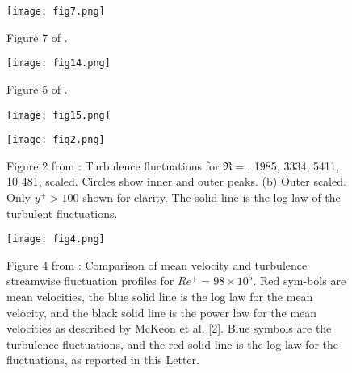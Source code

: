 \documentclass[11pt]{article}
\begin{document}
\begin{figure}[ht]
\begin{center}
\texttt{[image: fig7.png]}\\
\end{center}
\caption{Figure 7 of \cite{bernardini_etal2014}.}
\label{fig:fluctuations}
\end{figure}

\begin{figure}[ht]
\begin{center}
\texttt{[image: fig14.png]}\\
\end{center}
\caption{Figure 5 of \cite{bernardini_etal2014}.}
\label{fig:pe}
\end{figure}

\begin{figure}[ht]
\begin{center}
\texttt{[image: fig15.png]}\\
\end{center}
\caption{}
\label{fig:spec}
\end{figure}

\begin{figure}[ht]
\begin{center}
\texttt{[image: fig2.png]}\\
\end{center}
\caption{Figure 2 from \cite{hultmark_etal201}: Turbulence fluctuations for $\Re =$, 1985, 3334, 5411, 10 481, scaled. Circles show inner and outer peaks. (b) Outer scaled. Only $y^+ > 100$ shown for clarity. The solid line is the log law of the turbulent fluctuations.}
\label{fig:turb_vel}
\end{figure}


\begin{figure}[ht]
\begin{center}
\texttt{[image: fig4.png]}\\
\end{center}
\caption{Figure 4 from \cite{hultmark_etal201}: Comparison of mean velocity and turbulence streamwise fluctuation profiles for $Re^+ = 98 \times10^5$. Red sym-bols are mean velocities, the blue solid line is the log law for the mean velocity, and the black solid line is the power law for the mean velocities as described by McKeon et al. [2]. Blue symbols are the turbulence fluctuations, and the red solid line is the log law for the fluctuations, as reported in this Letter.}
\label{fig:mean_turb_vel}
\end{figure}


\nocite{pope2000}



\end{document}

